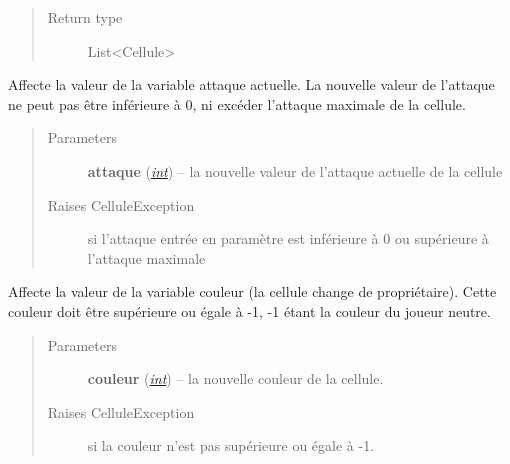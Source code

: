 \documentclass[letterpaper,10pt,english]{sphinxmanual}
\begin{document}
\begin{fulllineitems}
\begin{fulllineitems}
\begin{quote}
\begin{description}
\item[{Return type}] \leavevmode
List\textless{}Cellule\textgreater{}

\end{description}\end{quote}

\end{fulllineitems}


\begin{fulllineitems}
\label{index:Cellule.Cellule.setAttaque}
Affecte la valeur de la variable attaque actuelle.
La nouvelle valeur de l'attaque ne peut pas être inférieure à 0, ni excéder l'attaque maximale de la cellule.
\begin{quote}\begin{description}
\item[{Parameters}] \leavevmode
\textbf{attaque} (\href{http://docs.python.org/library/functions.html\#int}{\emph{int}}) -- la nouvelle valeur de l'attaque actuelle de la cellule

\item[{Raises CelluleException}] \leavevmode
si l'attaque entrée en paramètre est inférieure à 0 ou supérieure à l'attaque maximale

\end{description}\end{quote}

\end{fulllineitems}


\begin{fulllineitems}
\label{index:Cellule.Cellule.setCouleur}
Affecte la valeur de la variable couleur (la cellule change de propriétaire). 
Cette couleur doit être supérieure ou égale à -1, -1 étant la couleur du joueur neutre.
\begin{quote}\begin{description}
\item[{Parameters}] \leavevmode
\textbf{couleur} (\href{http://docs.python.org/library/functions.html\#int}{\emph{int}}) -- la nouvelle couleur de la cellule.

\item[{Raises CelluleException}] \leavevmode
si la couleur n'est pas supérieure ou égale à -1.


\end{description}
\end{quote}
\end{fulllineitems}
\end{fulllineitems}
\end{document}
